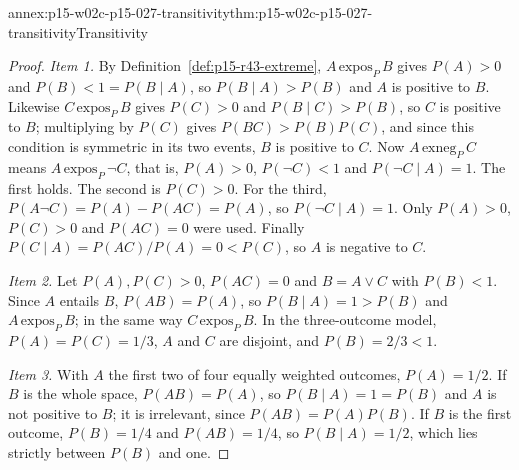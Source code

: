 \begin{annexitem}{annex:p15-w02c-p15-027-transitivity}{thm:p15-w02c-p15-027-transitivity}{Transitivity}
\begin{proof}
\emph{Item 1.} By Definition~\ref{def:p15-r43-extreme},
\(A\,\mathrm{expos}_P\,B\) gives \(P(A)>0\) and
\(P(B)<1=P(B\mid A)\), so \(P(B\mid A)>P(B)\) and \(A\) is positive to
\(B\). Likewise \(C\,\mathrm{expos}_P\,B\) gives \(P(C)>0\) and
\(P(B\mid C)>P(B)\), so \(C\) is positive to \(B\); multiplying by
\(P(C)\) gives \(P(BC)>P(B)P(C)\), and since this condition is symmetric
in its two events, \(B\) is positive to \(C\). Now
\(A\,\mathrm{exneg}_P\,C\) means \(A\,\mathrm{expos}_P\,\neg C\), that is,
\(P(A)>0\), \(P(\neg C)<1\) and \(P(\neg C\mid A)=1\). The first holds.
The second is \(P(C)>0\). For the third,
\(P(A\neg C)=P(A)-P(AC)=P(A)\), so \(P(\neg C\mid A)=1\). Only
\(P(A)>0\), \(P(C)>0\) and \(P(AC)=0\) were used. Finally
\(P(C\mid A)=P(AC)/P(A)=0<P(C)\), so \(A\) is negative to \(C\).

\emph{Item 2.} Let \(P(A),P(C)>0\), \(P(AC)=0\) and \(B=A\vee C\) with
\(P(B)<1\). Since \(A\) entails \(B\), \(P(AB)=P(A)\), so
\(P(B\mid A)=1>P(B)\) and \(A\,\mathrm{expos}_P\,B\); in the same way
\(C\,\mathrm{expos}_P\,B\). In the three-outcome model,
\(P(A)=P(C)=1/3\), \(A\) and \(C\) are disjoint, and \(P(B)=2/3<1\).

\emph{Item 3.} With \(A\) the first two of four equally weighted outcomes,
\(P(A)=1/2\). If \(B\) is the whole space, \(P(AB)=P(A)\), so
\(P(B\mid A)=1=P(B)\) and \(A\) is not positive to \(B\); it is
irrelevant, since \(P(AB)=P(A)P(B)\). If \(B\) is the first outcome,
\(P(B)=1/4\) and \(P(AB)=1/4\), so \(P(B\mid A)=1/2\), which lies
strictly between \(P(B)\) and one.
\end{proof}
\end{annexitem}

